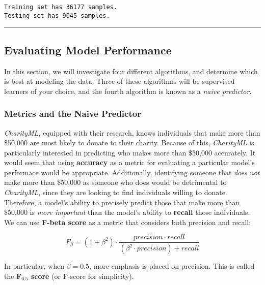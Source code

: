 \documentclass[11pt]{article}
\begin{document}
    \begin{Verbatim}[commandchars=\\\{\}]
Training set has 36177 samples.
Testing set has 9045 samples.

    \end{Verbatim}

    \begin{center}\rule{0.5\linewidth}{\linethickness}\end{center}

\hypertarget{evaluating-model-performance}{%
\subsection{Evaluating Model
Performance}\label{evaluating-model-performance}}

In this section, we will investigate four different algorithms, and
determine which is best at modeling the data. Three of these algorithms
will be supervised learners of your choice, and the fourth algorithm is
known as a \emph{naive predictor}.

    \hypertarget{metrics-and-the-naive-predictor}{%
\subsubsection{Metrics and the Naive
Predictor}\label{metrics-and-the-naive-predictor}}

\emph{CharityML}, equipped with their research, knows individuals that
make more than \$50,000 are most likely to donate to their charity.
Because of this, \emph{CharityML} is particularly interested in
predicting who makes more than \$50,000 accurately. It would seem that
using \textbf{accuracy} as a metric for evaluating a particular model's
performace would be appropriate. Additionally, identifying someone that
\emph{does not} make more than \$50,000 as someone who does would be
detrimental to \emph{CharityML}, since they are looking to find
individuals willing to donate. Therefore, a model's ability to precisely
predict those that make more than \$50,000 is \emph{more important} than
the model's ability to \textbf{recall} those individuals. We can use
\textbf{F-beta score} as a metric that considers both precision and
recall:

\[ F_{\beta} = (1 + \beta^2) \cdot \frac{precision \cdot recall}{\left( \beta^2 \cdot precision \right) + recall} \]

In particular, when \(\beta = 0.5\), more emphasis is placed on
precision. This is called the \textbf{F\(_{0.5}\) score} (or F-score for
simplicity).
\end{document}
